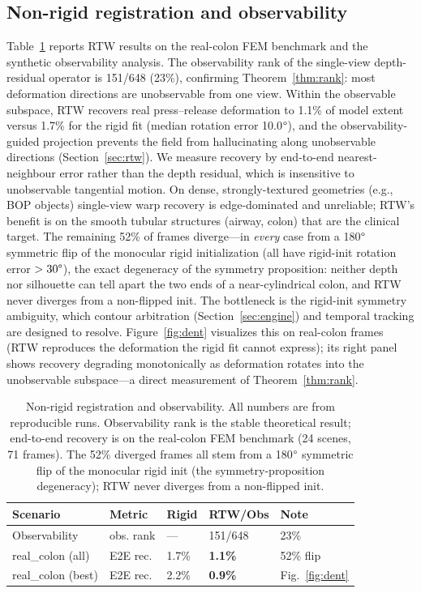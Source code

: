 \documentclass[9pt,twoside,web]{ieeecolor2}
\begin{document}
\subsection{Non-rigid registration and observability}
Table~\ref{tab:nonrigid} reports RTW results on the real-colon FEM benchmark and the synthetic observability analysis. The observability rank of the single-view depth-residual operator is 151/648 (23\%), confirming Theorem~\ref{thm:rank}: most deformation directions are unobservable from one view. Within the observable subspace, RTW recovers real press--release deformation to 1.1\% of model extent versus 1.7\% for the rigid fit (median rotation error 10.0$\degree$), and the observability-guided projection prevents the field from hallucinating along unobservable directions (Section~\ref{sec:rtw}). We measure recovery by end-to-end nearest-neighbour error rather than the depth residual, which is insensitive to unobservable tangential motion. On dense, strongly-textured geometries (e.g., BOP objects) single-view warp recovery is edge-dominated and unreliable; RTW's benefit is on the smooth tubular structures (airway, colon) that are the clinical target. The remaining 52\% of frames diverge---in \emph{every} case from a 180$\degree$ symmetric flip of the monocular rigid initialization (all have rigid-init rotation error $>30\degree$), the exact degeneracy of the symmetry proposition: neither depth nor silhouette can tell apart the two ends of a near-cylindrical colon, and RTW never diverges from a non-flipped init. The bottleneck is the rigid-init symmetry ambiguity, which contour arbitration (Section~\ref{sec:engine}) and temporal tracking are designed to resolve. Figure~\ref{fig:dent} visualizes this on real-colon frames (RTW reproduces the deformation the rigid fit cannot express); its right panel shows recovery degrading monotonically as deformation rotates into the unobservable subspace---a direct measurement of Theorem~\ref{thm:rank}.

\begin{table}[t]
\centering
\caption{Non-rigid registration and observability. All numbers are from reproducible runs. Observability rank is the stable theoretical result; end-to-end recovery is on the real-colon FEM benchmark (24 scenes, 71 frames). The 52\% diverged frames all stem from a 180$\degree$ symmetric flip of the monocular rigid init (the symmetry-proposition degeneracy); RTW never diverges from a non-flipped init.}
\label{tab:nonrigid}
\setlength{\tabcolsep}{3pt}\small
\begin{tabular}{lllll}
\toprule
Scenario & Metric & Rigid & RTW/Obs & Note \\
\midrule
Observability & obs. rank & --- & 151/648 & 23\% \\
real\_colon (all) & E2E rec. & 1.7\% & \textbf{1.1\%} & 52\% flip \\
real\_colon (best) & E2E rec. & 2.2\% & \textbf{0.9\%} & Fig.~\ref{fig:dent} \\
\bottomrule
\end{tabular}
\end{table}
\end{document}
